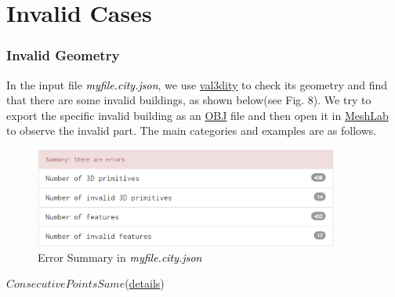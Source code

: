 \documentclass[12pt]{article}
\begin{document}
\section{Invalid Cases}
\subsubsection*{Invalid Geometry}

In the input file \textcolor{black}{\textit{myfile.city.json}}, we use \href{http://geovalidation.bk.tudelft.nl/val3dity/}{val3dity} to check its geometry and find that there are some invalid buildings, as shown below(see Fig. 8). We try to export the specific invalid building as an \href{https://docs.fileformat.com/3d/obj/}{OBJ} file and then open it in \href{https://www.meshlab.net/}{MeshLab} to observe the invalid part. The main categories and examples are as follows.

\begin{figure}[h] %
\centering
\includegraphics[width=10cm]{val3dityerror.PNG}
\caption{Error Summary in \textcolor{black}{\textit{myfile.city.json}}}
\end{figure}
$Consecutive Points Same$(\href{https://val3dity.readthedocs.io/en/latest/errors/#consecutive-points-same}{details})
\end{document}

